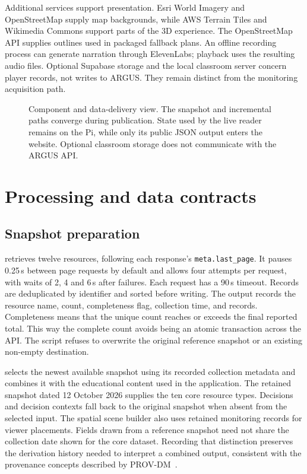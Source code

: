 \documentclass[10pt,a4paper]{article}
\begin{document}
Additional services support presentation. Esri World Imagery and OpenStreetMap supply map backgrounds, while AWS Terrain Tiles and Wikimedia Commons support parts of the 3D experience. The OpenStreetMap API supplies outlines used in packaged fallback plans. An offline recording process can generate narration through ElevenLabs; playback uses the resulting audio files. Optional Supabase storage and the local classroom server concern player records, not writes to ARGUS. They remain distinct from the monitoring acquisition path.

\begin{figure}[p]
\centering

\caption{Component and data-delivery view. The snapshot and incremental paths converge during publication. State used by the live reader remains on the Pi, while only its public JSON output enters the website. Optional classroom storage does not communicate with the ARGUS API.}
\label{fig:containers}
\end{figure}

\section{Processing and data contracts}
\subsection{Snapshot preparation}
 retrieves twelve resources, following each response's \texttt{meta.last\_page}. It pauses 0.25\,s between page requests by default and allows four attempts per request, with waits of 2, 4 and 6\,s after failures. Each request has a 90\,s timeout. Records are deduplicated by identifier and sorted before writing. The output records the resource name, count, completeness flag, collection time, and records. Completeness means that the unique count reaches or exceeds the final reported total. This way the complete count avoids being an atomic transaction across the API. The script refuses to overwrite the original reference snapshot or an existing non-empty destination.

 selects the newest available snapshot using its recorded collection metadata and combines it with the educational content used in the application. The retained snapshot dated 12 October 2026 supplies the ten core resource types. Decisions and decision contexts fall back to the original snapshot when absent from the selected input. The spatial scene builder also uses retained monitoring records for viewer placements. Fields drawn from a reference snapshot need not share the collection date shown for the core dataset. Recording that distinction preserves the derivation history needed to interpret a combined output, consistent with the provenance concepts described by PROV-DM~\cite{prov2013}.
\end{document}
